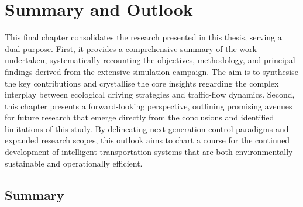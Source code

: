 \chapter{Summary and Outlook}
\label{ch:SummaryOutlook}

This final chapter consolidates the research presented in this thesis, serving a dual purpose. First, it provides a comprehensive summary of the work undertaken, systematically recounting the objectives, methodology, and principal findings derived from the extensive simulation campaign. The aim is to synthesise the key contributions and crystallise the core insights regarding the complex interplay between ecological driving strategies and traffic-flow dynamics. Second, this chapter presents a forward-looking perspective, outlining promising avenues for future research that emerge directly from the conclusions and identified limitations of this study. By delineating next-generation control paradigms and expanded research scopes, this outlook aims to chart a course for the continued development of intelligent transportation systems that are both environmentally sustainable and operationally efficient.

\section{Summary}
\label{sec:Summary}

